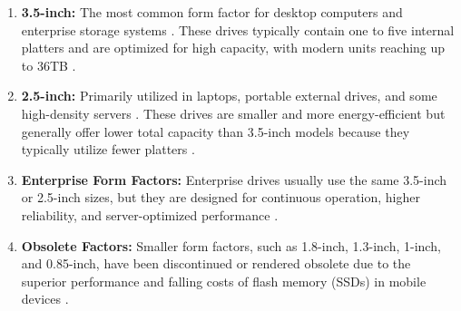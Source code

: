 \begin{enumerate}[label=\roman*.]
    \item \textbf{3.5-inch:} 
    The most common form factor for desktop computers and enterprise storage systems \cite{wiki_hdd, gfg_hdd_memory}.
     These drives typically contain one to five internal platters and are optimized for high capacity, with modern units
     reaching up to 36TB \cite{wiki_hdd}.

    \item \textbf{2.5-inch:} Primarily utilized in laptops, portable external drives, and some high-density servers 
    \cite{wiki_hdd, gfg_hdd_memory}. These drives are smaller and more energy-efficient but generally offer lower total 
    capacity than 3.5-inch models because they typically utilize fewer platters \cite{wiki_hdd}.
    
    \item \textbf{Enterprise Form Factors:} 
    Enterprise drives usually use the same 3.5-inch
    or 2.5-inch sizes, but they are designed for continuous operation, higher reliability,
    and server-optimized performance \cite{gfg_hdd_memory, wiki_hdd}.
    \item \textbf{Obsolete Factors:} Smaller form factors, such as 1.8-inch, 1.3-inch, 1-inch, and 0.85-inch, have been discontinued or rendered obsolete due to the superior performance and falling costs of flash memory (SSDs) in mobile devices \cite{wiki_hdd}.
\end{enumerate}

